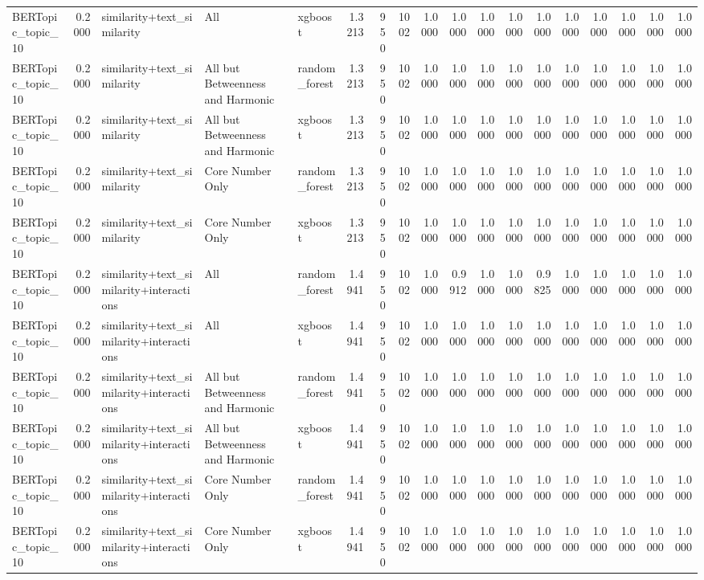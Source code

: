 \begin{tabular}{lrlllrrrrrrrrrrrrr}
BERTopic_topic_10 & 0.2000 & similarity+text_similarity & All & xgboost & 1.3213 & 950 & 1002 & 1.0000 & 1.0000 & 1.0000 & 1.0000 & 1.0000 & 1.0000 & 1.0000 & 1.0000 & 1.0000 & 1.0000 \\
BERTopic_topic_10 & 0.2000 & similarity+text_similarity & All but Betweenness and Harmonic & random_forest & 1.3213 & 950 & 1002 & 1.0000 & 1.0000 & 1.0000 & 1.0000 & 1.0000 & 1.0000 & 1.0000 & 1.0000 & 1.0000 & 1.0000 \\
BERTopic_topic_10 & 0.2000 & similarity+text_similarity & All but Betweenness and Harmonic & xgboost & 1.3213 & 950 & 1002 & 1.0000 & 1.0000 & 1.0000 & 1.0000 & 1.0000 & 1.0000 & 1.0000 & 1.0000 & 1.0000 & 1.0000 \\
BERTopic_topic_10 & 0.2000 & similarity+text_similarity & Core Number Only & random_forest & 1.3213 & 950 & 1002 & 1.0000 & 1.0000 & 1.0000 & 1.0000 & 1.0000 & 1.0000 & 1.0000 & 1.0000 & 1.0000 & 1.0000 \\
BERTopic_topic_10 & 0.2000 & similarity+text_similarity & Core Number Only & xgboost & 1.3213 & 950 & 1002 & 1.0000 & 1.0000 & 1.0000 & 1.0000 & 1.0000 & 1.0000 & 1.0000 & 1.0000 & 1.0000 & 1.0000 \\
BERTopic_topic_10 & 0.2000 & similarity+text_similarity+interactions & All & random_forest & 1.4941 & 950 & 1002 & 1.0000 & 0.9912 & 1.0000 & 1.0000 & 0.9825 & 1.0000 & 1.0000 & 1.0000 & 1.0000 & 1.0000 \\
BERTopic_topic_10 & 0.2000 & similarity+text_similarity+interactions & All & xgboost & 1.4941 & 950 & 1002 & 1.0000 & 1.0000 & 1.0000 & 1.0000 & 1.0000 & 1.0000 & 1.0000 & 1.0000 & 1.0000 & 1.0000 \\
BERTopic_topic_10 & 0.2000 & similarity+text_similarity+interactions & All but Betweenness and Harmonic & random_forest & 1.4941 & 950 & 1002 & 1.0000 & 1.0000 & 1.0000 & 1.0000 & 1.0000 & 1.0000 & 1.0000 & 1.0000 & 1.0000 & 1.0000 \\
BERTopic_topic_10 & 0.2000 & similarity+text_similarity+interactions & All but Betweenness and Harmonic & xgboost & 1.4941 & 950 & 1002 & 1.0000 & 1.0000 & 1.0000 & 1.0000 & 1.0000 & 1.0000 & 1.0000 & 1.0000 & 1.0000 & 1.0000 \\
BERTopic_topic_10 & 0.2000 & similarity+text_similarity+interactions & Core Number Only & random_forest & 1.4941 & 950 & 1002 & 1.0000 & 1.0000 & 1.0000 & 1.0000 & 1.0000 & 1.0000 & 1.0000 & 1.0000 & 1.0000 & 1.0000 \\
BERTopic_topic_10 & 0.2000 & similarity+text_similarity+interactions & Core Number Only & xgboost & 1.4941 & 950 & 1002 & 1.0000 & 1.0000 & 1.0000 & 1.0000 & 1.0000 & 1.0000 & 1.0000 & 1.0000 & 1.0000 & 1.0000 \\

\end{tabular}
